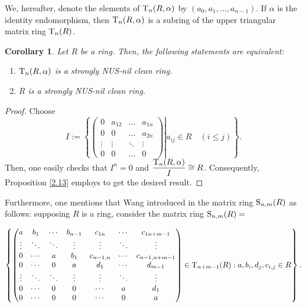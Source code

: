 \documentclass[12pt]{amsart}
\newtheorem{corollary}[theorem]{Corollary}
\theoremstyle{definition}
\begin{document}
\medskip

We, hereafter, denote the elements of ${\rm T}_{n}(R, \alpha)$ by $(a_{0},a_{1},\ldots , a_{n-1})$. If $\alpha $ is the identity endomorphism, then ${\rm T}_{n}(R,\alpha )$ is a subring of the upper triangular matrix ring ${\rm T}_{n}(R)$.

\begin{corollary}\label{2.20}
Let $R$ be a ring. Then, the following statements are equivalent:
\begin{enumerate}
\item
${\rm T}_{n}(R,\alpha)$ is a strongly NUS-nil clean ring.
\item
$R$ is a strongly NUS-nil clean ring.
\end{enumerate}
\end{corollary}

\begin{proof}
Choose
$$I:=\left\{
\left.
\begin{pmatrix}
		0 & a_{12} & \ldots & a_{1n} \\
		0 & 0 & \ldots & a_{2n} \\
		\vdots & \vdots & \ddots & \vdots \\
		0 & 0 & \ldots & 0
	\end{pmatrix} \right| a_{ij}\in R \quad (i\leq j )
	\right\}.$$
Then, one easily checks that $I^{n}=0$ and $\dfrac{{\rm T}_{n}(R,\alpha )}{I} \cong R$. Consequently, Proposition \ref{2.13} employs to get the desired result.
\end{proof}

Furthermore, one mentions that Wang introduced in \cite{13} the matrix ring ${\rm S}_{n,m}(R)$ as follows: supposing $R$ is a ring, consider the matrix ring ${\rm S}_{n,m}(R)=$

$$\left\{ \begin{pmatrix}
   a & b_1 & \cdots & b_{n-1} & c_{1n} & \cdots & c_{1 n+m-1}\\
   \vdots  & \ddots & \ddots & \vdots & \vdots & \ddots & \vdots \\
   0 & \cdots & a & b_1 & c_{n-1,n} & \cdots & c_{n-1,n+m-1} \\
   0 & \cdots & 0 & a & d_1 & \cdots & d_{m-1} \\
   \vdots  & \ddots & \ddots & \vdots & \vdots & \ddots & \vdots \\
   0 & \cdots & 0 & 0  & \cdots & a & d_1 \\
   0 & \cdots & 0 & 0  & \cdots & 0 & a
\end{pmatrix}\in {\rm T}_{n+m-1}(R) : a, b_i, d_j,c_{i,j} \in R \right\}.$$
\end{document}
